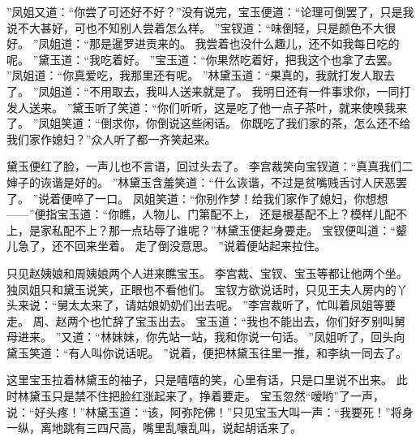 ”凤姐又道：“你尝了可还好不好？”没有说完，宝玉便道：“论理可倒罢了，只是我说不大甚好，可也不知别人尝着怎么样。
”宝钗道：“味倒轻，只是颜色不大很好。
”凤姐道：“那是暹罗进贡来的。
我尝着也没什么趣儿，还不如我每日吃的呢。
”黛玉道：“我吃着好。
”宝玉道：“你果然吃着好，把我这个也拿了去罢。
”凤姐道：“你真爱吃，我那里还有呢。
”林黛玉道：“果真的，我就打发人取去了。
”凤姐道：“不用取去，我叫人送来就是了。
我明日还有一件事求你，一同打发人送来。
”黛玉听了笑道：“你们听听，这是吃了他一点子茶叶，就来使唤我来了。
”凤姐笑道：“倒求你，你倒说这些闲话。
你既吃了我们家的茶，怎么还不给我们家作媳妇？”众人听了都一齐笑起来。
\par
黛玉便红了脸，一声儿也不言语，回过头去了。
李宫裁笑向宝钗道：“真真我们二婶子的诙谐是好的。
”林黛玉含羞笑道：“什么诙谐，不过是贫嘴贱舌讨人厌恶罢了。
”说着便啐了一口。
凤姐笑道：“你别作梦！给我们家作了媳妇，你想想——”便指宝玉道：“你瞧，人物儿、门第配不上，
还是根基配不上？模样儿配不上，是家私配不上？那一点玷辱了谁呢？”林黛玉便起身要走。
宝钗便叫道：“颦儿急了，还不回来坐着。
走了倒没意思。
”说着便站起来拉住。
\par
只见赵姨娘和周姨娘两个人进来瞧宝玉。
李宫裁、宝钗、宝玉等都让他两个坐。
独凤姐只和黛玉说笑，正眼也不看他们。
宝钗方欲说话时，只见王夫人房内的丫头来说：“舅太太来了，请姑娘奶奶们出去呢。
”李宫裁听了，忙叫着凤姐等要走。
周、赵两个也忙辞了宝玉出去。
宝玉道：“我也不能出去，你们好歹别叫舅母进来。
”又道：“林妹妹，你先站一站，我和你说一句话。
”凤姐听了，回头向黛玉笑道：“有人叫你说话呢。
”说着，便把林黛玉往里一推，和李纨一同去了。
\par
这里宝玉拉着林黛玉的袖子，只是嘻嘻的笑，心里有话，只是口里说不出来。
此时林黛玉只是禁不住把脸红涨起来了，挣着要走。
宝玉忽然“嗳哟”了一声，说：“好头疼！”林黛玉道：“该，阿弥陀佛！”只见宝玉大叫一声：“我要死！”将身一纵，离地跳有三四尺高，嘴里乱嚷乱叫，说起胡话来了。
